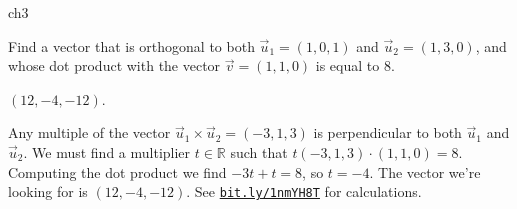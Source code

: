 {\begin{problems}{ch3}
	\begin{problem}
		Find a vector that is orthogonal to both $\vec{u}_1 = (1, 0, 1)$ and $\vec{u}_2 =(1, 3, 0)$, 
		 and whose dot product with the vector  $\vec{v}= (1, 1, 0)$ is equal to $8$.
						\begin{answer}$(12, -4, -12)$.\end{answer}
		\begin{solution}
			Any multiple of the vector $\vec{u}_1 \times \vec{u}_2 = (-3,1,3)$ 
			is perpendicular to both $\vec{u}_1$ and 	$\vec{u}_2$.
			We must find a multiplier $t \in \mathbb{R}$ such that 
			$t(-3,1,3) \cdot (1, 1, 0) = 8$.
			Computing the dot product we find $-3t + t = 8$, so $t=-4$.
			The vector we're looking for is $(12, -4, -12)$.
			See \href{http://bit.ly/1nmYH8T}{\texttt{bit.ly/1nmYH8T}} for calculations.
		\end{solution}
	\end{problem}


\end{problems}

} 
